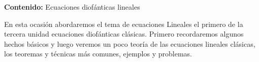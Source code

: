{\Large\textbf{Contenido:} Ecuaciones diofánticas lineales}

En esta ocasión abordaremos el tema de ecuaciones Lineales el primero de la tercera unidad ecuaciones diofánticas clásicas.
Primero recordaremos algunos hechos básicos y luego veremos un poco teoría de las ecuaciones lineales clásicas, los teoremas
y técnicas más comunes, ejemplos y problemas.